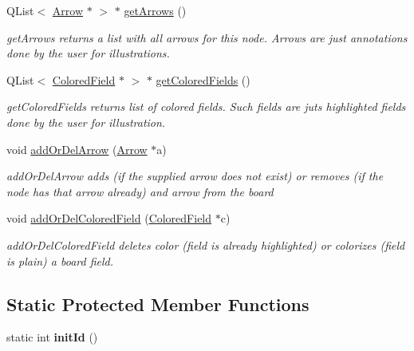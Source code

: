 \begin{DoxyCompactItemize}
Q\-List$<$ \hyperlink{structchess_1_1Arrow}{Arrow} $\ast$ $>$ $\ast$ \hyperlink{classchess_1_1GameNode_a4a5615b47f4f284d60b501e3f546f8da}{get\-Arrows} ()
\begin{DoxyCompactList}\small\item\em get\-Arrows returns a list with all arrows for this node. Arrows are just annotations done by the user for illustrations. \end{DoxyCompactList}\item 
Q\-List$<$ \hyperlink{structchess_1_1ColoredField}{Colored\-Field} $\ast$ $>$ $\ast$ \hyperlink{classchess_1_1GameNode_a4971268bae92d4341b59fc3b73b1031d}{get\-Colored\-Fields} ()
\begin{DoxyCompactList}\small\item\em get\-Colored\-Fields returns list of colored fields. Such fields are juts highlighted fields done by the user for illustration. \end{DoxyCompactList}\item 
void \hyperlink{classchess_1_1GameNode_ae339f67fc19405804df8c5ba8a63bd50}{add\-Or\-Del\-Arrow} (\hyperlink{structchess_1_1Arrow}{Arrow} $\ast$a)
\begin{DoxyCompactList}\small\item\em add\-Or\-Del\-Arrow adds (if the supplied arrow does not exist) or removes (if the node has that arrow already) and arrow from the board \end{DoxyCompactList}\item 
void \hyperlink{classchess_1_1GameNode_ae8846b9c88b9b59075e84e4346576f1d}{add\-Or\-Del\-Colored\-Field} (\hyperlink{structchess_1_1ColoredField}{Colored\-Field} $\ast$c)
\begin{DoxyCompactList}\small\item\em add\-Or\-Del\-Colored\-Field deletes color (field is already highlighted) or colorizes (field is plain) a board field. \end{DoxyCompactList}\end{DoxyCompactItemize}
\subsection*{Static Protected Member Functions}
\begin{DoxyCompactItemize}
\item 
\hypertarget{classchess_1_1GameNode_aa9d35a6c543e11213bdd0f49d5a3520e}{static int {\bfseries init\-Id} ()}\label{classchess_1_1GameNode_aa9d35a6c543e11213bdd0f49d5a3520e}

\end{DoxyCompactItemize}


